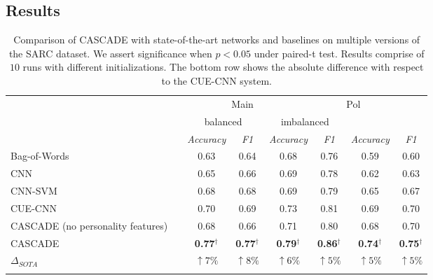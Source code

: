 \documentclass[11pt]{article}
\begin{document}
{\subsection{Results} \label{sec:results}
\begin{table}[t!]
	\small
	\newcommand\Y{\hphantom{$^1$}}
	\newcommand\X{\%\Y}
	\begin{center}
		\begin{tabular}{lc|c|c|c|c|c|c}
			\Xhline{3\arrayrulewidth}
			\multicolumn{2}{l|}{\multirow{3}{*}{Models}}&\multicolumn{4}{|c}{Main}&\multicolumn{2}{|c}{Pol} \\ \cline{3-8}
		   	&&\multicolumn{2}{|c}{balanced}&\multicolumn{2}{|c|}{imbalanced}&\multicolumn{2}{|c}{}\\ \cline{3-8}
            &&\scriptsize{\textit{Accuracy}}&\scriptsize{\textit{F1}}&\scriptsize{\textit{Accuracy}}&\scriptsize{\textit{F1}}&\scriptsize{\textit{Accuracy}}& \scriptsize{\textit{F1}}\\ \hline \hline
            Bag-of-Words&&0.63&0.64&0.68&0.76&0.59&0.60\\
            CNN&&0.65&0.66&0.69&0.78&0.62&0.63\\
            CNN-SVM~\cite{poria2016deeper}&&0.68&0.68&0.69&0.79&0.65&0.67\\ 
            CUE-CNN~\cite{amir2016modelling}&&0.70&0.69&0.73&0.81&0.69&0.70\\ \hline
            CASCADE (no personality features)&&0.68&0.66&0.71&0.80&0.68&0.70\\
            
      CASCADE&&\textbf{0.77}$^\dagger$&\textbf{0.77}$^\dagger$&\textbf{0.79}$^\dagger$&\textbf{0.86}$^\dagger$&\textbf{0.74}$^\dagger$&\textbf{0.75}$^\dagger$\\ \hline \hline
            $\Delta_{SOTA}$&& \textcolor{mygreen}{$\uparrow 7\%$} & \textcolor{mygreen}{$\uparrow 8\%$} & \textcolor{mygreen}{$\uparrow 6\%$} & \textcolor{mygreen}{$\uparrow 5\%$} & \textcolor{mygreen}{$\uparrow 5\%$} & \textcolor{mygreen}{$\uparrow 5\%$} \\ \Xhline{3\arrayrulewidth} 
            \multicolumn{8}{l}{\scriptsize{$\dagger$}:significantly better than CUE-CNN~\cite{amir2016modelling}.}
		\end{tabular}
	\end{center} 
	
	\vspace{-0.4cm}
	\caption {Comparison of CASCADE with state-of-the-art networks and baselines on multiple versions of the SARC dataset. We assert significance when $p < 0.05$ under paired-t test. Results comprise of $10$ runs with different initializations. The bottom row shows the absolute difference with respect to the CUE-CNN system.}
	\label{table:results}
\end{table} 

}
\end{document}
